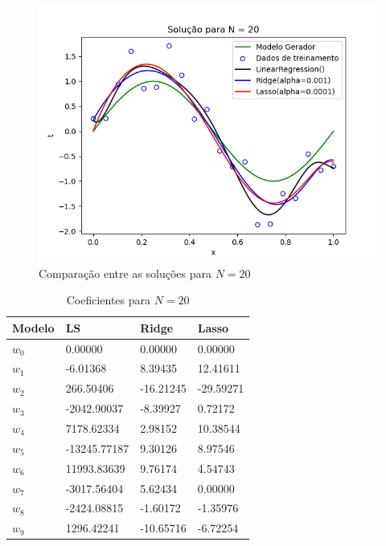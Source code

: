 \begin{figure}[H]
    \centering
    \caption{Comparação entre as soluções para $N=20$}
    \includegraphics[width=12cm]{E1_f20.png}
\end{figure}
\begin{table}[H]
    \caption{Coeficientes para $N=20$}
    \centering
        \begin{tabular}{|l|lll|}
            \toprule
            Modelo & LS & Ridge & Lasso \\
            \midrule
            $w_0$ & 0.00000 & 0.00000 & 0.00000 \\      
            $w_1$ & -6.01368 & 8.39435 & 12.41611 \\    
            $w_2$ & 266.50406 & -16.21245 & -29.59271 \\
            $w_3$ & -2042.90037 & -8.39927 & 0.72172 \\ 
            $w_4$ & 7178.62334 & 2.98152 & 10.38544 \\  
            $w_5$ & -13245.77187 & 9.30126 & 8.97546 \\ 
            $w_6$ & 11993.83639 & 9.76174 & 4.54743 \\
            $w_7$ & -3017.56404 & 5.62434 & 0.00000 \\
            $w_8$ & -2424.08815 & -1.60172 & -1.35976 \\
            $w_9$ & 1296.42241 & -10.65716 & -6.72254 \\
            \bottomrule
        \end{tabular}
\end{table}


